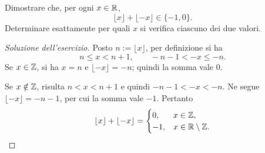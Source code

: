 \begin{exercise}
\label{ex:fondamenti-parte-intera-numeri-opposti}
Dimostrare che, per ogni $x\in\mathbb{R}$,
\[
  \lfloor x\rfloor+\lfloor-x\rfloor\in\{-1,0\}.
\]
Determinare esattamente per quali $x$ si verifica
ciascuno dei due valori.
\end{exercise}
\begin{proof}[Soluzione dell'esercizio]
Posto $n:=\lfloor x\rfloor$, per definizione si ha
\[
  n\le x<n+1,
  \qquad -n-1<-x\le-n.
\]
Se $x\in\mathbb{Z}$, si ha $x=n$ e $\lfloor-x\rfloor=-n$;
quindi la somma vale $0$.

Se $x\notin\mathbb{Z}$, risulta $n<x<n+1$ e quindi
$-n-1<-x<-n$. Ne segue $\lfloor-x\rfloor=-n-1$,
per cui la somma vale $-1$. Pertanto
\[
  \lfloor x\rfloor+\lfloor-x\rfloor=
  \begin{cases}
    0,&x\in\mathbb{Z},\\
    -1,&x\in\mathbb{R}\setminus\mathbb{Z}.
  \end{cases}
\]
\end{proof}
